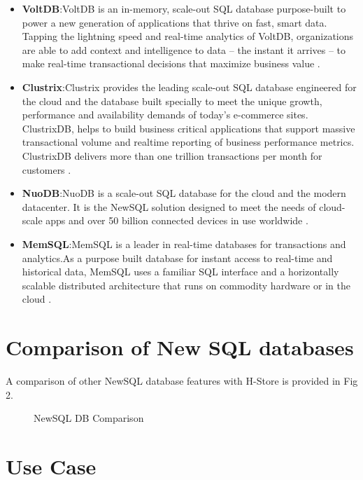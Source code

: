 \documentclass[9pt,twocolumn,twoside]{../../styles/osajnl}
\begin{document}
\begin{itemize}
\item \textbf{VoltDB}:VoltDB is an in-memory, scale-out SQL database purpose-built to power a new
generation of applications that thrive on fast, smart data. Tapping the lightning
speed and real-time analytics of VoltDB, organizations are able to add context
and intelligence to data – the instant it arrives – to make real-time transactional
decisions that maximize business value \cite{www-VoltDB}.

\item \textbf{Clustrix}:Clustrix provides the leading scale-out SQL database engineered for the cloud
and the database built specially to meet the unique growth, performance and
availability demands of today’s e-commerce sites. ClustrixDB, helps to build
business critical applications that support massive transactional volume and realtime
reporting of business performance metrics. ClustrixDB delivers more than
one trillion transactions per month for customers \cite{www-ClustrixDB}.

\item \textbf{NuoDB}:NuoDB is a scale-out SQL database for the cloud and the modern datacenter. It is
the NewSQL solution designed to meet the needs of cloud-scale apps and over
50 billion connected devices in use worldwide \cite{www-NuoDB}.

\item \textbf{MemSQL}:MemSQL is a leader in real-time databases for transactions and analytics.As a
purpose built database for instant access to real-time and historical data,
MemSQL uses a familiar SQL interface and a horizontally scalable distributed
architecture that runs on commodity hardware or in the cloud \cite{www-Memsql}.
\end{itemize}

\section{Comparison of New SQL databases}

A comparison of other NewSQL  database features with H-Store is provided in Fig 2.
\begin{figure}[]
\centering
\graphicspath{ {images/} }
\caption{NewSQL DB Comparison} \cite{pavlo16}
\label{fig:false-color}
\end{figure}


\section{Use Case}
 
\end{document}

